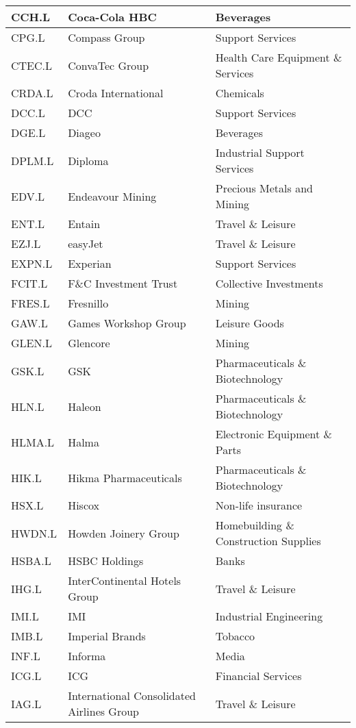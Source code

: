 \begin{longtable}{|p{2cm}|p{4cm}|p{6cm}|}
CCH.L & Coca-Cola HBC & Beverages \\ \hline
CPG.L & Compass Group & Support Services \\ \hline
CTEC.L & ConvaTec Group & Health Care Equipment \& Services \\ \hline
CRDA.L & Croda International & Chemicals \\ \hline
DCC.L & DCC & Support Services \\ \hline
DGE.L & Diageo & Beverages \\ \hline
DPLM.L & Diploma & Industrial Support Services \\ \hline
EDV.L & Endeavour Mining & Precious Metals and Mining \\ \hline
ENT.L & Entain & Travel \& Leisure \\ \hline
EZJ.L & easyJet & Travel \& Leisure \\ \hline
EXPN.L & Experian & Support Services \\ \hline
FCIT.L & F\&C Investment Trust & Collective Investments \\ \hline
FRES.L & Fresnillo & Mining \\ \hline
GAW.L & Games Workshop Group & Leisure Goods \\ \hline
GLEN.L & Glencore & Mining \\ \hline
GSK.L & GSK & Pharmaceuticals \& Biotechnology \\ \hline
HLN.L & Haleon & Pharmaceuticals \& Biotechnology \\ \hline
HLMA.L & Halma & Electronic Equipment \& Parts \\ \hline
HIK.L & Hikma Pharmaceuticals & Pharmaceuticals \& Biotechnology \\ \hline
HSX.L & Hiscox & Non-life insurance \\ \hline
HWDN.L & Howden Joinery Group & Homebuilding \& Construction Supplies \\ \hline
HSBA.L & HSBC Holdings & Banks \\ \hline
IHG.L & InterContinental Hotels Group & Travel \& Leisure \\ \hline
IMI.L & IMI & Industrial Engineering \\ \hline
IMB.L & Imperial Brands & Tobacco \\ \hline
INF.L & Informa & Media \\ \hline
ICG.L & ICG & Financial Services \\ \hline
IAG.L & International Consolidated Airlines Group & Travel \& Leisure \\ \hline

\end{longtable}
